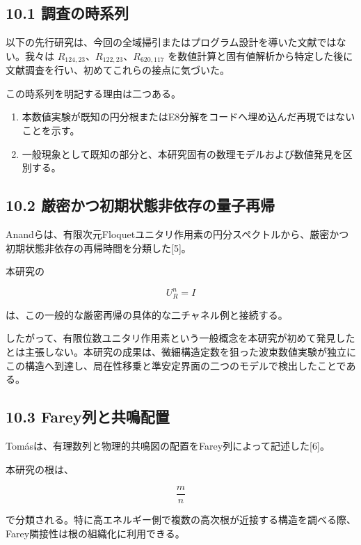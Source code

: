 \documentclass[
  10pt,
  a4paper,
]{article}
\providecommand{\tightlist}{%
  \setlength{\itemsep}{0pt}\setlength{\parskip}{0pt}}
\begin{document}
\subsection{10.1
調査の時系列}\label{ux8abfux67fbux306eux6642ux7cfbux5217}

以下の先行研究は、今回の全域掃引またはプログラム設計を導いた文献ではない。我々は
\(R_{124,23}\)、\(R_{122,23}\)、\(R_{620,117}\)
を数値計算と固有値解析から特定した後に文献調査を行い、初めてこれらの接点に気づいた。

この時系列を明記する理由は二つある。

\begin{enumerate}
\def\labelenumi{\arabic{enumi}.}
\tightlist
\item
  本数値実験が既知の円分根またはE8分解をコードへ埋め込んだ再現ではないことを示す。
\item
  一般現象として既知の部分と、本研究固有の数理モデルおよび数値発見を区別する。
\end{enumerate}

\subsection{10.2
厳密かつ初期状態非依存の量子再帰}\label{ux53b3ux5bc6ux304bux3064ux521dux671fux72b6ux614bux975eux4f9dux5b58ux306eux91cfux5b50ux518dux5e30}

Anandらは、有限次元Floquetユニタリ作用素の円分スペクトルから、厳密かつ初期状態非依存の再帰時間を分類した{[}5{]}。

本研究の

\[
U_R^n=I
\]

は、この一般的な厳密再帰の具体的な二チャネル例と接続する。

したがって、有限位数ユニタリ作用素という一般概念を本研究が初めて発見したとは主張しない。本研究の成果は、微細構造定数を狙った波束数値実験が独立にこの構造へ到達し、局在性移乗と準安定界面の二つのモデルで検出したことである。

\subsection{10.3
Farey列と共鳴配置}\label{fareyux5217ux3068ux5171ux9cf4ux914dux7f6e}

Tomásは、有理数列と物理的共鳴図の配置をFarey列によって記述した{[}6{]}。

本研究の根は、

\[
\frac{m}{n}
\]

で分類される。特に高エネルギー側で複数の高次根が近接する構造を調べる際、Farey隣接性は根の組織化に利用できる。
\end{document}
